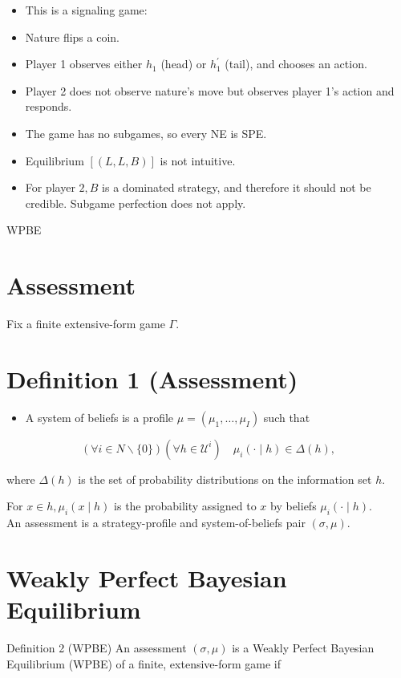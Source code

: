 \documentclass[10pt]{article}
\begin{document}
\begin{itemize}
  \item This is a signaling game:
  \item Nature flips a coin.
  \item Player 1 observes either $h_{1}$ (head) or $h_{1}^{\prime}$ (tail), and chooses an action.
  \item Player 2 does not observe nature's move but observes player 1's action and responds.
  \item The game has no subgames, so every NE is SPE.
  \item Equilibrium $[(L, L, B)]$ is not intuitive.
  \item For player $2, B$ is a dominated strategy, and therefore it should not be credible. Subgame perfection does not apply.
\end{itemize}

WPBE

\section*{Assessment}
Fix a finite extensive-form game $\Gamma$.

\section*{Definition 1 (Assessment)}
\begin{itemize}
  \item A system of beliefs is a profile $\mu=\left(\mu_{1}, \ldots, \mu_{I}\right)$ such that
\end{itemize}

$$
(\forall i \in N \backslash\{0\})\left(\forall h \in \mathcal{U}^{i}\right) \quad \mu_{i}(\cdot \mid h) \in \Delta(h),
$$

where $\Delta(h)$ is the set of probability distributions on the information set $h$.

For $x \in h, \mu_{i}(x \mid h)$ is the probability assigned to $x$ by beliefs $\mu_{i}(\cdot \mid h)$.\\
An assessment is a strategy-profile and system-of-beliefs pair $(\sigma, \mu)$.

\section*{Weakly Perfect Bayesian Equilibrium}
Definition 2 (WPBE) An assessment $(\sigma, \mu)$ is a Weakly Perfect Bayesian Equilibrium (WPBE) of a finite, extensive-form game if
\end{document}
